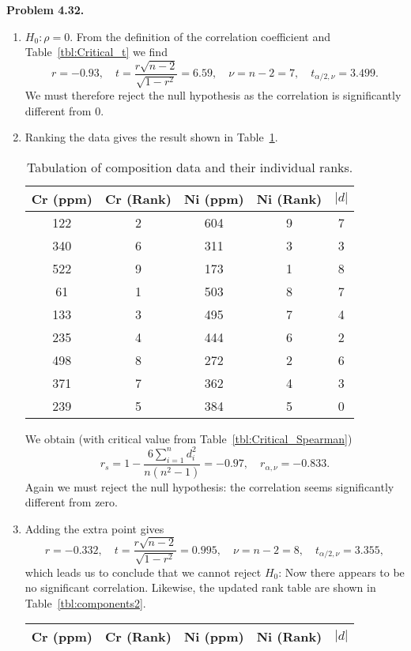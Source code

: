 \noindent
\bf{Problem 4.32.} \\
\begin{enumerate}[label=\alph*)]
\item $H_0: \rho = 0.$  From the definition of the correlation coefficient and Table~\ref{tbl:Critical_t} we find
$$
r = -0.93, \quad t = \frac{r\sqrt{n-2}}{\sqrt{1-r^2}} = 6.59, \quad \nu = n - 2 = 7, \quad t_{\alpha/2,\nu} = 3.499.
$$
We must therefore reject the null hypothesis as the correlation is significantly different from 0.
\item Ranking the data gives the result shown in Table~\ref{tbl:components}.
\begin{table}[H]
\centering
\begin{tabular}{|c|c|c|c|c|} \hline
\bf{Cr (ppm)}	&	\bf{Cr (Rank)}	& \bf{Ni (ppm)} &	\bf{Ni (Rank)} & $|d|$ \\ \hline
122	&	2	& 604 &	9	& 7\\ \hline
340	&	6	& 311 &	3	& 3\\ \hline
522	&	9	& 173 &	1	& 8\\ \hline
61	&	1	& 503 &	8	& 7\\ \hline
133	&	3	& 495 &	7	& 4\\ \hline
235	&	4	& 444 &	6	& 2\\ \hline
498	&	8	& 272 &	2	& 6\\ \hline
371	&	7	& 362 &	4	& 3\\ \hline
239	&	5	& 384 &	5	& 0\\ \hline
\end{tabular}
\caption{Tabulation of composition data and their individual ranks.}
\label{tbl:components}
\end{table}
We obtain (with critical value from Table~\ref{tbl:Critical_Spearman})
$$
r_s = 1 - \frac{6\sum_{i=1}^n d_i^2}{n(n^2 - 1)} = -0.97, \quad r_{\alpha,\nu} = -0.833.
$$
Again we must reject the null hypothesis: the correlation seems significantly different from zero.
\item Adding the extra point gives
$$
r = -0.332, \quad t = \frac{r\sqrt{n-2}}{\sqrt{1-r^2}} = 0.995, \quad \nu = n - 2 = 8, \quad t_{\alpha/2,\nu} = 3.355,
$$
which leads us to conclude that we cannot reject $H_0$: Now there appears to be no significant correlation. Likewise,
the updated rank table are shown in Table~\ref{tbl:components2}.
\begin{table}[h]
\centering
\begin{tabular}{|c|c|c|c|c|} \hline
\bf{Cr (ppm)}	&	\bf{Cr (Rank)}	& \bf{Ni (ppm)} &	\bf{Ni (Rank)} & $|d|$ \\ \hline

\end{tabular}
\end{table}
\end{enumerate}
